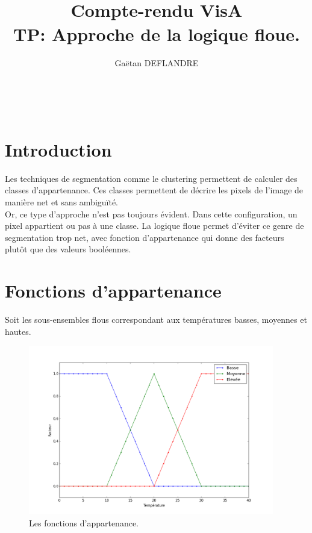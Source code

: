 \documentclass[a4paper,11pt]{article}
\title{
  \noindent\hrulefill \\
  \vspace{10mm}
  \textbf{Compte-rendu VisA} \\
  \vspace{5mm}
  TP: Approche de la logique floue.
}
\author{Gaëtan DEFLANDRE}
\begin{document}
\maketitle
\noindent\hrulefill \\


\section*{Introduction}

Les techniques de segmentation comme le clustering permettent de 
calculer des classes d'appartenance. Ces classes permettent de 
décrire les pixels de l'image de manière net et sans ambiguïté.\\

Or, ce type d'approche n'est pas toujours évident. Dans cette 
configuration, un pixel appartient ou pas à une classe. La logique 
floue permet d'éviter ce genre de segmentation trop net, avec 
fonction d'appartenance qui donne des facteurs plutôt que des 
valeurs booléennes.\\


\newpage


\section{Fonctions d'appartenance}

Soit les sous-ensembles flous correspondant aux températures basses, 
moyennes et hautes.

\begin{figure}[H]
  \begin{center}
  \includegraphics[height=280px]{images/exercice1.png}
  \caption{Les fonctions d'appartenance.}
  \end{center}
\end{figure}
\end{document}
